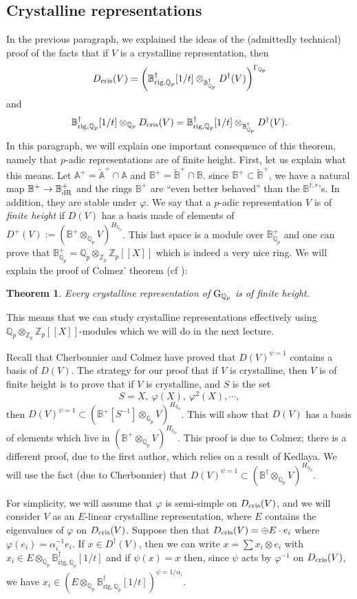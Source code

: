 \documentclass[11pt]{amsart}
\def\Z{{\mathbb Z}_p}
\def\Q{{\mathbb Q}_p}
\def\g{{\rm G}_{\Q}}
\def\ra{\rightarrow}
\def\Qp{{\mathbb Q}_p}
\def\aa{\mathbb{A}}
\def\bb{\mathbb{B}}
\def\aplus{\mathbb{A}^+}
\def\bplus{\mathbb{B}^+}
\def\atplus{\widetilde{\mathbb{A}}^+}
\def\btplus{\widetilde{\mathbb{B}}^+}
\newcommand{\bdag}[1]{\mathbb{B}^{\dagger #1}}
\newcommand{\bnrig}[2]{\mathbb{B}^{\dagger #1}_{\mathrm{rig} #2}}
\def\bdR{\mathbb{B}_{\rm dR}}
\def\dcris{D_{\rm cris}}
\renewcommand{\ddag}[1]{D^{\dagger #1}}
\newtheorem{thm}[definit]{\bf{Theorem}}
\begin{document}
\subsection{Crystalline representations} 
In the previous paragraph, we explained the ideas of the  
(admittedly technical) proof of the 
facts that if $V$ is a crystalline representation, then  
\[ \dcris(V) = \left(\bnrig{}{,\Q}[1/t] 
\otimes_{\bdag{}_{\Q}} \ddag{}(V) \right)^{\Gamma_{\Q}} \] and  
\[ \bnrig{}{,\Q}[1/t] 
\otimes_{\Q} \dcris(V)  = \bnrig{}{,\Q}[1/t] 
\otimes_{\bdag{}_{\Q}} \ddag{}(V). \] 
In this paragraph, we will explain one important consequence of this 
theorem, namely that $p$-adic representations are of finite 
height. First, let us explain what this means. Let $\aplus = \atplus 
\cap \aa$ and $\bplus = \btplus \cap \bb$. since $\bplus \subset 
\btplus$, we have a natural map $\bplus \ra \bdR^+$ and the rings 
$\bplus$ are ``even better behaved'' than the $\bdag{,r}$'s. In 
addition, they are stable under $\varphi$. We say that a $p$-adic 
representation $V$ is of \emph{finite height} if $D(V)$ has a basis 
made of elements of $D^+(V) := (\bplus \otimes_{\Q} V)^{H_{\Q}}$. 
This last space is a module over $\bplus_{\Qp}$ and one can prove that 
$\bplus_{\Q} = \Q \otimes_{\Z} \Z[[X]]$ which is indeed a very nice 
ring. We will explain the proof of Colmez' theorem (cf \cite{Co99}):  
\begin{thm}\label{crishf} 
Every crystalline representation of $\g$ is of finite height.  
\end{thm} 
This means 
that we can study crystalline representations effectively using $\Q 
\otimes_{\Z} \Z[[X]]$-modules which we will do in the next lecture.  
 
Recall that Cherbonnier and Colmez have proved that $D(V)^{\psi=1}$ 
contains a basis of $D(V)$. The strategy for our proof that if $V$ is 
crystalline, then $V$ is of finite height is to prove that if $V$ is 
crystalline, and $S$ is the set \[ S = X,\ \varphi(X),\ 
\varphi^2(X),\cdots, \]  
then $D(V)^{\psi=1} \subset (\bplus[S^{-1}] \otimes_{\Q} 
V)^{H_{\Q}}$. This will show  
that $D(V)$ has a basis of elements which live in $(\bplus \otimes_{\Q} 
V)^{H_{\Q}}$. This proof is due to Colmez; there is a different proof, 
due to the first author, which relies on a result of Kedlaya. We will 
use the fact (due to Cherbonnier) that $D(V)^{\psi=1} \subset (\bdag{}  
\otimes_{\Q} V)^{H_{\Q}}$.  
 
For simplicity, we will assume that $\varphi$ is semi-simple on 
$\dcris(V)$, and we will consider $V$ as  
an $E$-linear crystalline representation, where $E$ contains the 
eigenvalues of $\varphi$ on $\dcris(V)$. Suppose then that $\dcris(V) = 
\oplus E \cdot e_i$ where $\varphi(e_i)=\alpha_i^{-1} e_i$.  
If $x \in \ddag{}(V)$, 
then we can write $x=\sum x_i \otimes e_i$ with $x_i \in 
E \otimes_{\Q} \bnrig{}{,\Q}[1/t]$ and if $\psi(x)=x$ then, since $\psi$ acts by 
$\varphi^{-1}$ on $\dcris(V)$, we have $x_i \in 
(E \otimes_{\Q} \bnrig{}{,\Q}[1/t])^{\psi=1/\alpha_i}$.  
 
\end{document}
